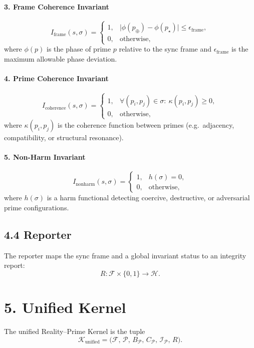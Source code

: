 \documentclass[12pt]{article}
\begin{document}
\paragraph{3. Frame Coherence Invariant}
\[
I_{\text{frame}}(s,\sigma) =
\begin{cases}
1, & \bigl| \phi(p_{\oplus}) - \phi(p_{\star}) \bigr|
      \le \epsilon_{\text{frame}}, \\[4pt]
0, & \text{otherwise},
\end{cases}
\]
where \(\phi(p)\) is the phase of prime \(p\) relative to the sync frame
and \(\epsilon_{\text{frame}}\) is the maximum allowable phase deviation.

\paragraph{4. Prime Coherence Invariant}
\[
I_{\text{coherence}}(s,\sigma) =
\begin{cases}
1, & \forall (p_i,p_j) \in \sigma:\ 
      \kappa(p_i,p_j) \ge 0, \\[4pt]
0, & \text{otherwise},
\end{cases}
\]
where \(\kappa(p_i,p_j)\) is the coherence function between primes
(e.g.\ adjacency, compatibility, or structural resonance).

\paragraph{5. Non-Harm Invariant}
\[
I_{\text{nonharm}}(s,\sigma) =
\begin{cases}
1, & h(\sigma) = 0, \\[4pt]
0, & \text{otherwise},
\end{cases}
\]
where \(h(\sigma)\) is a harm functional detecting coercive,
destructive, or adversarial prime configurations.

\subsection*{4.4 Reporter}

The reporter maps the sync frame and a global invariant status to an integrity report:
\[
R : \mathcal{F} \times \{0,1\} \to \mathcal{H}.
\]

\section*{5. Unified Kernel}

The unified Reality--Prime Kernel is the tuple
\[
\mathcal{K}_{\text{unified}} =
\bigl(\mathcal{F},\, \mathcal{P},\, B_{\mathcal{P}},\, C_{\mathcal{P}},\, \mathcal{I}_{\mathcal{P}},\, R\bigr).
\]
\end{document}
